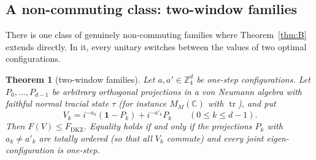 \documentclass[11pt]{amsart}
\newtheorem{theorem}{Theorem}[section]
\theoremstyle{definition}
\theoremstyle{remark}
\newcommand{\Z}{\mathbb{Z}}
\newcommand{\C}{\mathbb{C}}
\newcommand{\tr}{\operatorname{tr}}
\newcommand{\FD}{F_{\mathrm{DKZ}}}
\newcommand{\one}{\mathbf{1}}
\begin{document}
\subsection{A non-commuting class: two-window families}
There is one class of genuinely non-commuting families where Theorem~\ref{thm:B} extends directly. In it, every
unitary switches between the values of two optimal configurations.

\begin{theorem}[two-window families]\label{thm:D}
Let $a,a'\in\Z_4^d$ be one-step configurations. Let $P_0,\dots,P_{d-1}$ be arbitrary orthogonal projections in a von
Neumann algebra with faithful normal tracial state $\tau$ (for instance $M_M(\C)$ with $\tr$), and put
\[
V_k=i^{-a_k}(\one-P_k)+i^{-a'_k}P_k\qquad(0\le k\le d-1).
\]
Then $F(V)\le\FD$. Equality holds if and only if the projections $P_k$ with $a_k\ne a'_k$ are totally ordered (so that
all $V_k$ commute) and every joint eigen-configuration is one-step.
\end{theorem}
\end{document}
